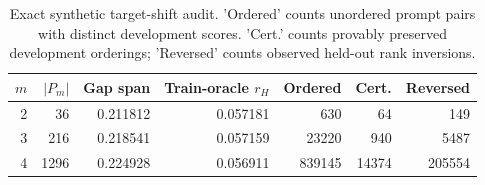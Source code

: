 \begin{table}[htbp]
\centering\small
\caption{Exact synthetic target-shift audit. 'Ordered' counts unordered prompt pairs with distinct development scores. 'Cert.' counts provably preserved development orderings; 'Reversed' counts observed held-out rank inversions.}
\label{tab:target-transfer}
\begin{tabular}{rrrrrrr}
\toprule
$m$ & $|P_m|$ & Gap span & Train-oracle $r_H$ & Ordered & Cert. & Reversed \\
\midrule
2 & 36 & 0.211812 & 0.057181 & 630 & 64 & 149\\
3 & 216 & 0.218541 & 0.057159 & 23220 & 940 & 5487\\
4 & 1296 & 0.224928 & 0.056911 & 839145 & 14374 & 205554\\
\bottomrule
\end{tabular}
\end{table}
